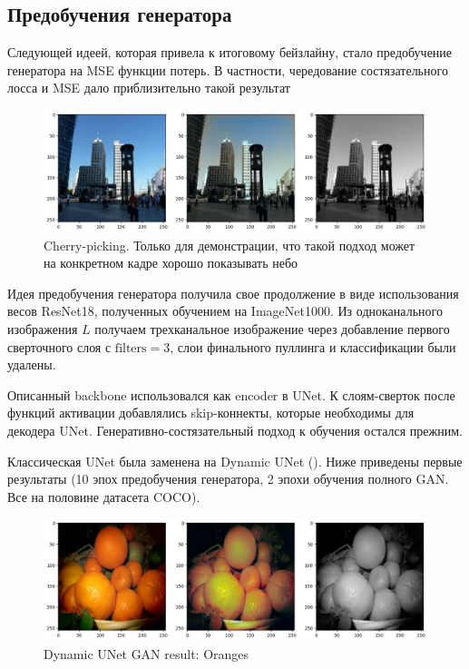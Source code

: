 \documentclass[14pt]{article}
\begin{document}
\subsection{Предобучения генератора}

Следующей идеей, которая привела к итоговому бейзлайну, стало предобучение генератора на
MSE функции потерь. В частности, чередование состязательного лосса и MSE дало приблизительно такой результат


\begin{figure}[H]
    \centering
    \includegraphics[width=1.0\textwidth]{resources/gan_and_chaos_pretrain.png}
    \caption{Cherry-picking. Только для демонстрации, что такой подход может на конкретном кадре хорошо показывать небо}
    \label{fig:id_figura}
\end{figure}


Идея предобучения генератора получила свое продолжение в виде использования весов ResNet18, полученных обучением
на ImageNet1000. Из одноканального изображения $L$ получаем трехканальное изображение через добавление первого сверточного слоя
с $\text{filters}=3$, слои финального пуллинга и классификации были удалены.

Описанный backbone использовался как encoder в UNet. К слоям-сверток после функций активации добавлялись skip-коннекты, которые
необходимы для декодера UNet. Генеративно-состязательный подход к обучения остался прежним.

Классическая UNet была заменена на Dynamic UNet (\cite{yang2024dynamicunetadaptivelycalibrate}). Ниже приведены
первые результаты (10 эпох предобучения генератора, 2 эпохи обучения полного GAN. Все на половине датасета COCO).

\begin{figure}[H]
    \centering
    \includegraphics[width=1.0\textwidth]{resources/dynamic_unet_gan_results/oranges.png}
    \caption{Dynamic UNet GAN result: Oranges}
    \label{fig:oranges}
\end{figure}
\end{document}
